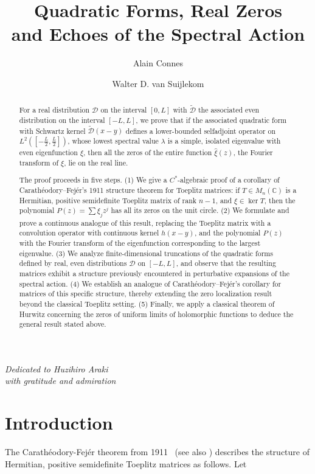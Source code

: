 \documentclass{amsart}
\title{Quadratic Forms, Real Zeros \\[2ex] and Echoes of the Spectral Action}
\author{Alain Connes}
\author{Walter D. van Suijlekom}
\def\tilde{\widetilde}
\begin{document}
\maketitle
\begin{center}
  \large\itshape %
  Dedicated to Huzihiro Araki\\[0.5em]
  with gratitude and admiration
\end{center}
\begin{abstract}

	For a  real distribution  $\mathcal{D}$  on the interval $[0,L]$ with $\tilde{\mathcal{ D}}$ the associated even distribution on the interval $[-L, L]$, we prove that if the associated quadratic form with Schwartz kernel $\tilde{\mathcal{D}}(x - y)$ defines a lower-bounded selfadjoint operator  on $L^2([-\frac{L}{2}, \frac{L}{2}])$, whose lowest spectral value $\lambda$ is a simple, isolated eigenvalue with even eigenfunction $\xi$, then all the zeros of the entire function $\widehat \xi(z)$, the Fourier transform of $\xi$, lie on the real line.

The proof proceeds in five steps.
(1) We give a $C^*$-algebraic proof of a corollary of Carathéodory--Fej\'er’s 1911 structure theorem for Toeplitz matrices: if $T \in M_n(\mathbb{C})$ is a Hermitian, positive semidefinite Toeplitz matrix of rank $n - 1$, and $\xi \in \ker T$, then the polynomial $P(z) = \sum \xi_j z^j$ has all its zeros on the unit circle.
(2) We formulate and prove a continuous analogue of this result, replacing the Toeplitz matrix with a convolution operator with continuous kernel $h(x - y)$, and the polynomial $P(z)$ with the Fourier transform of the eigenfunction corresponding to the largest eigenvalue.
(3) We analyze finite-dimensional truncations of the quadratic forms defined by real, even distributions $\mathcal{D}$ on $[-L, L]$, and observe that the resulting matrices exhibit a structure previously encountered in perturbative expansions of the spectral action.
(4) We establish an analogue of Carathéodory--Fej\'er’s corollary for matrices of this specific structure, thereby extending the zero localization result beyond the classical Toeplitz setting.
(5) Finally, we apply a classical theorem of Hurwitz concerning the zeros of uniform limits of holomorphic functions to deduce the general result stated above.
\end{abstract}
\tableofcontents
\section{Introduction}
The Carathéodory-Fej\'er theorem from 1911~\cite{CF11} (see also \cite[Theorem 1.3.6]{BW}) describes the structure of Hermitian, positive semidefinite Toeplitz matrices as follows. Let
\end{document}
